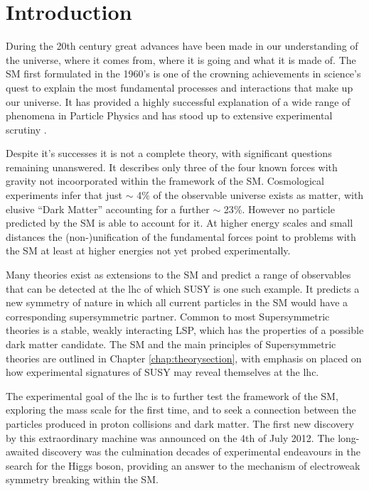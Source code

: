 \chapter{Introduction}
\label{chap:introduction}

During the 20th century great advances have been made in our understanding of the universe, where it comes from, where it is going and what it is made of. The \acf{SM} first formulated in the 1960's is one of the crowning achievements in science's quest to explain the most fundamental processes and interactions that make up our universe. It has provided a highly successful explanation of a wide range of phenomena in Particle Physics and has stood up to extensive experimental scrutiny \cite{pdg2012}.

Despite it's successes it is not  a complete theory, with significant questions remaining unanswered. It describes only three of the four known forces with gravity not incoorporated within the framework of the \ac{SM}. Cosmological experiments infer that just $\sim$ 4$\%$ of the observable universe exists as matter, with elusive ``Dark Matter'' accounting for a further $\sim$ 23$\%$. However no particle predicted by the \ac{SM} is able to account for it.  At higher energy scales and small distances the (non-)unification of the fundamental forces point to problems with the \ac{SM} at least at higher energies not yet probed experimentally. 

Many theories exist as extensions to the \ac{SM} and predict a range of observables that can be detected at the \acf{lhc} of which \acf{SUSY} is one such example. It predicts a new symmetry of nature in which all current particles in the \ac{SM} would have a corresponding supersymmetric partner. Common to most Supersymmetric theories is a stable, weakly interacting \acf{LSP}, which has the properties of a possible dark matter candidate. The \ac{SM} and the main principles of Supersymmetric theories are outlined in Chapter \ref{chap:theorysection}, with emphasis on placed on how experimental signatures of \ac{SUSY} may reveal themselves at the \ac{lhc}.

The experimental goal of the \ac{lhc} is to further test the framework of the \ac{SM}, exploring the \TeV mass scale for the first time, and to seek a connection between the particles produced in proton collisions and dark matter. The first new discovery by this extraordinary machine was announced on the 4th of July 2012. The long-awaited discovery was the culmination decades of experimental endeavours in the search for the Higgs boson, providing an answer to the mechanism of electroweak symmetry breaking within the \ac{SM}. 

